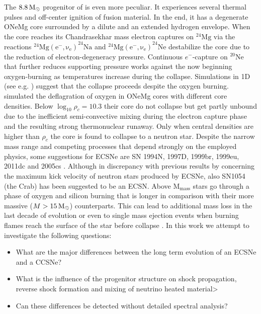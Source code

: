 \documentclass[fleqn,usenatbib]{mnras}
\newcommand{\solm}{\xspace\ensuremath{\rm{M_{\odot}}}\xspace}
\begin{document}
The $8.8\, \solm$ progenitor of \cite{Nomoto1984} is even more peculiar. It experiences  several thermal pulses and off-center ignition of fusion material. In the end, it has a degenerate ONeMg core surrounded by a dilute and an extended hydrogen envelope.
When the core reaches its Chandrasekhar mass electron captures on $\mathrm{^{24}Mg}$ via the reactions $\mathrm{^{24}Mg(e^-,\nu_e)}^{24}\mathrm{Na}$  and $\mathrm{^{24}Mg(e^-,\nu_e)}^{24}\mathrm{Ne}$ destabilize the core due to the reduction of electron-degeneracy pressure. Continuous $e^-$-capture on $\mathrm{^{20}Ne}$ that further reduces supporting pressure works against the now beginning oxygen-burning as temperatures increase during the collapse. Simulations in 1D (see e.g. \citep{Janka2008,Kitaura2006}) suggest that the collapse proceeds despite the oxygen burning. \cite{Jones2016} simulated the deflagration of oxygen in ONeMg cores with different core densities. Below $\log_{10}\rho_c=10.3$ their core do not collapse but get partly unbound due to the inefficient semi-convective mixing during the electron capture phase and the resulting strong thermonuclear runaway. Only when central densities are higher than $\rho_c$ the core is found to collapse to a neutron star.
Despite the narrow mass range and competing processes that depend strongly on the employed physics, some suggestions for ECSNe  are SN 1994N, 1997D, 1999br, 1999eu, 2011dc and 2005cs \citet{Stevenson2014}. Although in discrepancy with previous results by \citep{Gessner2018} concerning the maximum kick velocity of neutron stars produced by ECSNe, also SN1054 (the Crab) has been suggested to be an ECSN.
Above $\mathrm{M_{mass}}$ stars go through a phase of oxygen and silicon burning that is longer in comparison with their more massive ($M > 15\, \solm$) counterparts.  This can lead to additional mass loss in the last decade of evolution or even to single mass ejection events when burning flames reach the surface of the star before collapse \citet{Woosley2015}.
 In this work we attempt to investigate the following questions:
\begin{itemize}
\item  What are the major differences between the long term evolution of an ECSNe and a CCSNe?
\item What is the influence of the progenitor structure on shock propagation, reverse shock formation and mixing of neutrino heated material>
\item Can these differences be detected without detailed spectral analysis?
\end {itemize}
\end{document}
